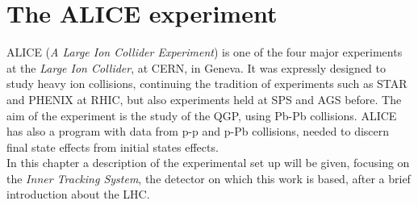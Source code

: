 \chapter{The ALICE experiment}
ALICE (\textit{A Large Ion Collider Experiment}) is one of the four major experiments at the \textit{Large Ion Collider}, at CERN, in Geneva. It was expressly designed to study heavy ion collisions, continuing the tradition of experiments such as STAR and PHENIX at RHIC, but also experiments held at SPS and AGS before. The aim of the experiment is the study of the QGP, using Pb-Pb collisions. ALICE has also a program with data from p-p and p-Pb collisions, needed to discern final state effects from initial states effects.\\
In this chapter a description of the experimental set up will be given, focusing on the \textit{Inner Tracking System}, the detector on which this work is based, after a brief introduction about the LHC.
